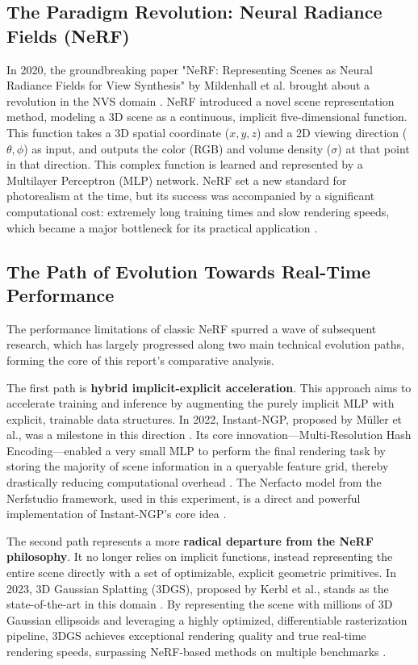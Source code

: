 \documentclass[11pt]{article}
\begin{document}
\subsection{The Paradigm Revolution: Neural Radiance Fields (NeRF)}
In 2020, the groundbreaking paper "NeRF: Representing Scenes as Neural Radiance Fields for View Synthesis" by Mildenhall et al. brought about a revolution in the NVS domain \cite{mildenhall2020nerf}. NeRF introduced a novel scene representation method, modeling a 3D scene as a continuous, implicit five-dimensional function. This function takes a 3D spatial coordinate ($x,y,z$) and a 2D viewing direction ($\theta, \phi$) as input, and outputs the color (RGB) and volume density ($\sigma$) at that point in that direction. This complex function is learned and represented by a Multilayer Perceptron (MLP) network. NeRF set a new standard for photorealism at the time, but its success was accompanied by a significant computational cost: extremely long training times and slow rendering speeds, which became a major bottleneck for its practical application \cite{gennerf2023}.

\subsection{The Path of Evolution Towards Real-Time Performance}
The performance limitations of classic NeRF spurred a wave of subsequent research, which has largely progressed along two main technical evolution paths, forming the core of this report's comparative analysis.

The first path is \textbf{hybrid implicit-explicit acceleration}. This approach aims to accelerate training and inference by augmenting the purely implicit MLP with explicit, trainable data structures. In 2022, Instant-NGP, proposed by Müller et al., was a milestone in this direction \cite{muller2022instant_long}. Its core innovation—Multi-Resolution Hash Encoding—enabled a very small MLP to perform the final rendering task by storing the majority of scene information in a queryable feature grid, thereby drastically reducing computational overhead \cite{nerfstudio_ingp}. The Nerfacto model from the Nerfstudio framework, used in this experiment, is a direct and powerful implementation of Instant-NGP's core idea \cite{nerfstudio_ingp}.

The second path represents a more \textbf{radical departure from the NeRF philosophy}. It no longer relies on implicit functions, instead representing the entire scene directly with a set of optimizable, explicit geometric primitives. In 2023, 3D Gaussian Splatting (3DGS), proposed by Kerbl et al., stands as the state-of-the-art in this domain \cite{kerbl2023gaussiansplatting}. By representing the scene with millions of 3D Gaussian ellipsoids and leveraging a highly optimized, differentiable rasterization pipeline, 3DGS achieves exceptional rendering quality and true real-time rendering speeds, surpassing NeRF-based methods on multiple benchmarks \cite{efficient3dgs2024}.
\end{document}
